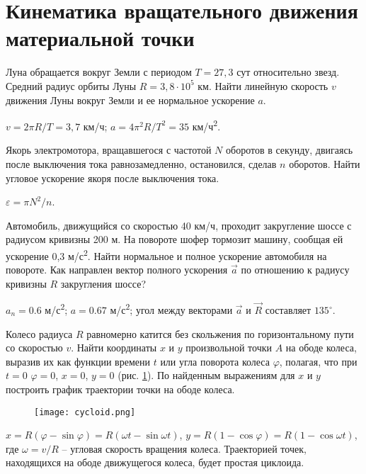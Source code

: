 \section{Кинематика вращательного движения материальной точки}

\introProblems

\begin{ex} %
Луна обращается вокруг Земли с периодом $T = 27,3$ сут относительно звезд. Средний радиус орбиты Луны $R = 3,8 \cdot 10^5$ км. Найти линейную скорость $v$ движения Луны вокруг Земли и ее нормальное ускорение $a$. 
\begin{ans}
$v = 2 \pi R/T = 3,7$ км/ч; $a = 4\pi^2 R/T^2 = 35$ км/ч\textsuperscript{2}.
\end{ans}
\end{ex}

\begin{ex} %
Якорь электромотора, вращавшегося с частотой $N$ оборотов в секунду, двигаясь после выключения тока равнозамедленно, остановился, сделав $n$ оборотов. Найти угловое ускорение якоря после выключения тока.
\begin{ans}
$\varepsilon = \pi N^2/n$.
\end{ans}
\end{ex}

\begin{ex} %
Автомобиль, движущийся со скоростью 40 км/ч, проходит закругление шоссе с радиусом кривизны 200 м. На повороте шофер тормозит машину, сообщая ей ускорение 0,3 м/с\textsuperscript{2}. Найти нормальное и полное ускорение автомобиля на повороте. Как направлен вектор полного ускорения $\vec{a}$ по отношению к радиусу кривизны $R$ закругления шоссе?
\begin{ans}
$a_n = 0.6$ м/с\textsuperscript{2}; $a = 0.67$ м/с\textsuperscript{2}; угол между векторами $\vec{a}$ и $\vec{R}$ составляет $135^{\circ}$.
\end{ans}
\end{ex}

\begin{ex} %
Колесо радиуса $R$ равномерно катится без скольжения по горизонтальному пути со скоростью $v$. Найти координаты $x$ и $y$ произвольной точки $A$ на ободе колеса, выразив их как функции времени $t$ или угла поворота колеса $\varphi$, полагая, что при $t = 0$ $\varphi = 0$, $x = 0$, $y = 0$ (рис. \ref{cycloid}). По найденным выражениям для $x$ и $y$ построить график траектории точки на ободе колеса.

\begin{figure}[h]
\centering
\texttt{[image: cycloid.png]}
\caption{}
\label{cycloid}
\end{figure}

\begin{ans}
$x= R(\varphi - \sin \varphi) = R(\omega t - \sin \omega t)$, $y=R(1-\cos \varphi) = R(1-\cos \omega t)$, где $\omega = v/R$ -- угловая скорость вращения колеса. Траекторией точек, находящихся на ободе движущегося колеса, будет простая циклоида.
\end{ans}
\end{ex}

